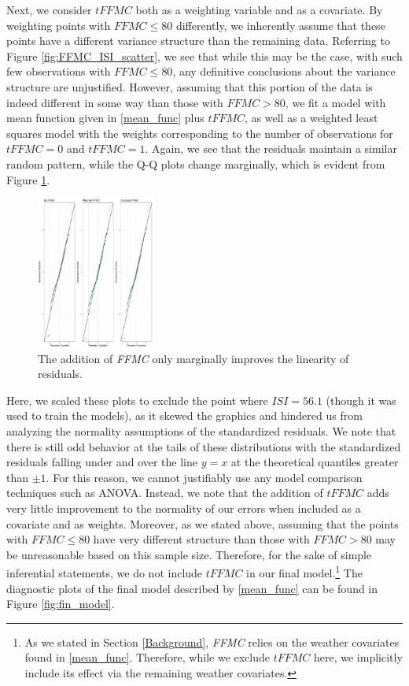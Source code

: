 \documentclass{article}
\begin{document}
Next, we consider $\textit{tFFMC}$ both as a weighting variable and as a covariate. By weighting points with $FFMC\leq 80$ differently, we inherently assume that these points have a different variance structure than the remaining data. Referring to Figure \ref{fig:FFMC_ISI_scatter}, we see that while this may be the case, with such few observations with $FFMC\leq 80$, any definitive conclusions about the variance structure are unjustified. However, assuming that this portion of the data is indeed different in some way than those with $FFMC > 80$, we fit a model with mean function given in \eqref{mean_func} plus $\textit{tFFMC}$, as well as a weighted least squares model with the weights corresponding to the number of observations for $\textit{tFFMC} = 0$ and $\textit{tFFMC} = 1$. Again, we see that the residuals maintain a similar random pattern, while the Q-Q plots change marginally, which is evident from Figure \ref{fig:ffmc_qq}. 
\begin{figure}[h!]
\centering
\includegraphics[width = .6\textwidth, height = 5cm]{FFMC-QQ.pdf}
\caption{The addition of \textit{FFMC} only marginally improves the linearity of residuals.}
\label{fig:ffmc_qq}{}
\end{figure}
Here, we scaled these plots to exclude the point where $ISI = 56.1$ (though it was used to train the models), as it skewed the graphics and hindered us from analyzing the normality assumptions of the standardized residuals. We note that there is still odd behavior at the tails of these distributions with the standardized residuals falling under and over the line $y = x$ at the theoretical quantiles greater than $\pm 1$. For this reason, we cannot justifiably use any model comparison techniques such as ANOVA. Instead, we note that the addition of $\textit{tFFMC}$ adds very little improvement to the normality of our errors when included as a covariate and as weights. Moreover, as we stated above, assuming that the points with $FFMC\leq 80$ have very different structure than those with $FFMC>80$ may be unreasonable based on this sample size. Therefore, for the sake of simple inferential statements, we do not include $\textit{tFFMC}$ in our final model.\footnote{As we stated in Section \ref{Background}, \textit{FFMC} relies on the weather covariates found in \eqref{mean_func}. Therefore, while we exclude $\textit{tFFMC}$ here, we implicitly include its effect via the remaining weather covariates.} The diagnostic plots of the final model described by \eqref{mean_func} can be found in Figure \ref{fig:fin_model}. 
\end{document}
